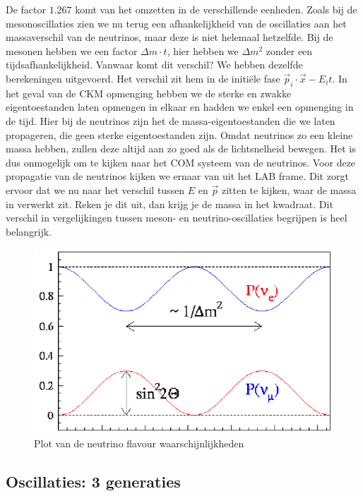 \documentclass[../main.tex]{subfiles}
\begin{document}
De factor $1.267$ komt van het omzetten in de verschillende eenheden. Zoals bij de mesonoscillaties zien we nu terug een afhankelijkheid van de oscillaties aan het massaverschil van de neutrinos, maar deze is niet helemaal hetzelfde. Bij de mesonen hebben we een factor $\Delta m\cdot t$, hier hebben we $\Delta m^2$ zonder een tijdsafhankelijkheid. Vanwaar komt dit verschil? We hebben dezelfde berekeningen uitgevoerd. Het verschil zit hem in de initiële fase $\vec{p}_{i} \cdot \vec{x}-E_{i} t$. In het geval van de CKM opmenging hebben we de sterke en zwakke eigentoestanden laten opmengen in elkaar en hadden we enkel een opmenging in de tijd. Hier bij de neutrinos zijn het de massa-eigentoestanden die we laten propageren, die geen sterke eigentoestanden zijn. Omdat neutrinos zo een kleine massa hebben, zullen deze altijd aan zo goed als de lichtsnelheid bewegen. Het is dus onmogelijk om te kijken naar het COM systeem van de neutrinos. Voor deze propagatie van de neutrinos kijken we ernaar van uit het LAB frame. Dit zorgt ervoor dat we nu naar het verschil tussen $E$ en $\vec{p}$ zitten te kijken, waar de massa in verwerkt zit. Reken je dit uit, dan krijg je de massa in het kwadraat. {\color{red} Dit verschil in vergelijkingen tussen meson- en neutrino-oscillaties begrijpen is heel belangrijk.}

\begin{figure}[h]
    \centering
    \includegraphics[width=0.6\linewidth]{neutrinos/neutrino_osc.png}
    \caption{Plot van de neutrino flavour waarschijnlijkheden}%
    \label{fig:neutrinos/neutrino_osc}
\end{figure}

\subsection{Oscillaties: 3 generaties}%
\label{sub:oscillaties_3_generaties}
\end{document}
